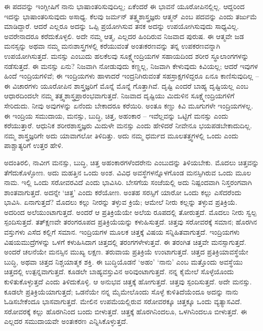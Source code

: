 ಈ ಪದವನ್ನು ಇಂಗ್ಲೀಷಿಗೆ ನಾನು ಭಾಷಾಂತರಿಸುವುದಿಲ್ಲ; ಏಕೆಂದರೆ ಈ ಭಾವನೆ ಯೂರೋಪಿನಲ್ಲಿಲ್ಲ. ಆದ್ದರಿಂದ ಇದನ್ನು ಭಾಷಾಂತರಿಸುವುದು ಅಸಾಧ್ಯ. ಕೆಲವು ಜರ್ಮನ್​ ತತ್ತ್ವಶಾಸ್ತ್ರಜ್ಞರು ಆತ್ಮನ್​ ಎಂಬ ಪದವನ್ನು  ಎಂದು ತರ್ಜುಮೆ ಮಾಡಿದ್ದಾರೆ. ಆದರೆ ಎಲ್ಲರೂ ಅದನ್ನು ಒಪ್ಪಿ ಪ್ರಯೋಗಿಸುವ ತನಕ ಅದನ್ನು ಉಪಯೋಗಿಸುವುದು ಸಾಧ್ಯವಿಲ್ಲ. ಅವರೇನಾದರೂ ಕರೆದುಕೊಳ್ಳಲಿ. ಅದೇ ನಮ್ಮ ಆತ್ಮ, ಎಲ್ಲದರ ಹಿಂದಿರುವ ನಿಜವಾದ ಪುರುಷ. ಈ ಆತ್ಮವೇ ಜಡ ಮನಸ್ಸನ್ನು ಅಥವಾ ನಮ್ಮ ಮನಃಶಾಸ್ತ್ರಗಳಲ್ಲಿ ಕರೆಯುವಂತೆ ಅಂತಃಕರಣವನ್ನು ತನ್ನ ಉಪಕರಣವನ್ನಾಗಿ ಉಪಯೋಗಿಸುತ್ತದೆ. ಮನಸ್ಸು ಎಂಬುದು ಹಲಕೆಲವು ಸೂಕ್ಷ್ಮೇಂದ್ರಿಯಗಳ ಸಹಾಯದಿಂದ ಶರೀರ ಸ್ಥೂಲಾಂಗಗಳನ್ನು ನಡೆಸುತ್ತದೆ. ಈ ಮನಸ್ಸು ಏನು? ನಿಜವಾಗಿ ನೋಡುವುದು ಕಣ್ಣಲ್ಲ, ನಿಜವಾಗಿ ಕೇಳುವುದು ಕಿವಿಯಲ್ಲ; ಆದರೆ ಇವುಗಳ ಹಿಂದೆ ಇಂದ್ರಿಯಗಳಿವೆ; ಈ ಇಂದ್ರಿಯಗಳು ಹಾಳಾದರೆ ಇಂದ್ರನಿಗಿರುವಂತೆ ಸಹಸ್ರಾಕ್ಷಗಳಿದ್ದರೂ ಏನೂ ಕಾಣಿಸುವುದಿಲ್ಲ – ಈ ವಿಚಾರಗಳು ಯೂರೋಪಿನ ಶಾಸ್ತ್ರಜ್ಞರಿಗೆ ಮೊನ್ನೆ ಮೊನ್ನೆ ಗೊತ್ತಾಗಿವೆ. ದೃಷ್ಟಿ ಎಂದರೆ ಬಾಹ್ಯ ದೃಷ್ಟಿಯಲ್ಲ ಎಂಬ ಆಧಾರದಿಂದಲೇ ನಮ್ಮ ತತ್ತ್ವಶಾಸ್ತ್ರಪ್ರಾರಂಭವಾಗುತ್ತದೆ. ನಿಜವಾದ ದೃಷ್ಟಿಯು ಮಿದುಳಿನ ಸೂಕ್ಷ್ಮೇಂದ್ರಿಯಗಳಿಗೆ ಸೇರಿದುದು. ನೀವು ಅವುಗಳನ್ನು ಏನೆಂದು ಬೇಕಾದರೂ ಕರೆಯಿರಿ. ಅಂತೂ ಕಣ್ಣು ಕಿವಿ ಮೂಗುಗಳೇ ಇಂದ್ರಿಯಗಳಲ್ಲ. ಈ ಇಂದ್ರಿಯ ಸಮುದಾಯ, ಮನಸ್ಸು, ಬುದ್ಧಿ, ಚಿತ್ತ, ಅಹಂಕಾರ – ಇವೆಲ್ಲವನ್ನು ಒಟ್ಟಿಗೆ ಮನಸ್ಸು  ಎಂದು ಕರೆಯುತ್ತಾರೆ. ಆಧುನಿಕ ಶರೀರಶಾಸ್ತ್ರಜ್ಞರು ಮಿದುಳೇ ಮನಸ್ಸು ಎಂದು ಹೇಳಿದರೆ ನೀವೇನೂ ಭಯಪಡಬೇಕಾದುದಿಲ್ಲ. ನಮ್ಮ ಶಾಸ್ತ್ರಜ್ಞರಿಗೇ ಅದು ಯಾವಾಗಲೋ ತಿಳಿದಿತ್ತು. ಅದು ನಮ್ಮ ಧರ್ಮದ ಮೂಲತತ್ತ್ವಗಳಲ್ಲಿ ಒಂದು ಎಂದು ಪಾಶ್ಚಾತ್ಯರಿಗೆ ಉತ್ತರ ಹೇಳಿ. 

ಅದಂತಿರಲಿ, ನಾವೀಗ ಮನಸ್ಸು, ಬುದ್ಧಿ, ಚಿತ್ತ ಅಹಂಕಾರಗಳೆಂದರೇನು ಎಂಬುದನ್ನು ತಿಳಿಯಬೇಕು. ಮೊದಲು ಚಿತ್ತವನ್ನು ತೆಗೆದುಕೊಳ್ಳೋಣ. ಅದು ಮಹತ್ತಿನ ಒಂದು ಅಂಶ. ವಿವಿಧ ಅವಸ್ಥೆಗಳನ್ನೊಳಗೊಂಡ ಮನಸ್ಸಿಗಿರುವ ಒಂದು ಮೂಲ ನಾಮ. ಇಲ್ಲಿ ಒಂದು ಸರೋವರವಿದೆ ಎಂದು ಭಾವಿಸಿರಿ. ಬೇಸಗೆಯ ಸಂಜೆಯಲ್ಲಿ ಅದು ನಿಷ್ಪಂದವಾಗಿ ನಿಸ್ತರಂಗವಾಗಿ ಶಾಂತವಾಗುತ್ತದೆ. ಅದನ್ನೇ ‘ಚಿತ್ತ’ ಎಂದು ಕರೆಯೋಣ. ಅಂತಹ ಸರಸ್ಸಿಗೆ ಯಾರೋ ಒಂದು ಕಲ್ಲು ಎಸೆದರೆಂದು ಭಾವಿಸಿ. ಏನಾಗುತ್ತದೆ? ಮೊದಲು ಕಲ್ಲು ನೀರನ್ನು ತಳ್ಳುವ ಕ್ರಿಯೆ; ಆಮೇಲೆ ನೀರು ಕಲ್ಲನ್ನು ತಳ್ಳುವ ಪ್ರತಿಕ್ರಿಯೆ. ಅದರಿಂದ ಅಲೆಯುಂಟಾಗುತ್ತದೆ. ಅಂದರೆ ಆ ಪ್ರತಿಕ್ರಿಯೆಯೇ ಅಲೆಯ ರೂಪದಲ್ಲಿ ತೋರುತ್ತದೆ. ಮೊದಲು ನೀರು ಸ್ವಲ್ಪ ಸ್ಪಂದಿಸುತ್ತದೆ. ತತ್​ಕ್ಷಣವೇ ತರಂಗರೂಪದ ಪ್ರತಿಕ್ರಿಯೆಯನ್ನು ಕಳುಹಿಸುತ್ತದೆ. ಚಿತ್ತವು ಸರೋವರಕ್ಕೆ ಸಮಾನ; ಹೊರಗಿನ ವಸ್ತುಗಳು ಎಸೆದ ಕಲ್ಲಿಗೆ ಸಮಾನ. ಇಂದ್ರಿಯಗಳ ಮೂಲಕ ಚಿತ್ತಕ್ಕೆ ವಿಷಯ ಸನ್ನಿಹಿತವಾಗುತ್ತದೆ. ಇಂದ್ರಿಯಗಳು ವಿಷಯಮುದ್ರೆಗಳನ್ನು ಒಳಗೆ ಕಳುಹಿಸಿದಾಗ ಚಿತ್ತದಲ್ಲಿ ತರಂಗಗಳೇಳುತ್ತವೆ. ಈ ತರಂಗಿತ ಚಿತ್ತವೇ ಮನಸ್ಸಾಗುತ್ತದೆ. ಅಂದರೆ ಚಲನೆಯೇ ಮನಸ್ಸಿನ ಮುಖ್ಯ ಲಕ್ಷಣ. ತರುವಾಯ ಪ್ರತಿಕ್ರಿಯೆ ಉಂಟಾಗುತ್ತದೆ. ಚಿತ್ತದ ಪ್ರತಿಕ್ರಿಯಾವಸ್ಥೆಯೇ ಬುದ್ಧಿ, ಅಥವಾ ಚಿತ್ತದ ನಿಶ್ಚಯಾತ್ಮಕ ಶಕ್ತಿ. ಈ ಬುದ್ಧಿಯೊಡನೆ ‘ಅಹಂ’ ‘ನಾನು’ ಎಂಬ ಮತ್ತೊಂದು ಅವಸ್ಥೆಯು ಚಿತ್ತದಲ್ಲಿ ಉತ್ಪನ್ನವಾಗುತ್ತದೆ. ಕೂಡಲೇ ಬಾಹ್ಯವಸ್ತುವಿನ ಅರಿವುಂಟಾಗುತ್ತದೆ. ನನ್ನ ಕೈಮೇಲೆ ಸೊಳ್ಳೆಯೊಂದು ಕುಳಿತುಕೊಳ್ಳುತ್ತದೆ ಎಂದು ತಿಳಿದುಕೊಳ್ಳಿ. ಆ ಅನುಭವ ಚಿತ್ತಕ್ಕೆ ಹೋಗುತ್ತದೆ. ಚಿತ್ತವು ಸ್ಪಂದಿಸುತ್ತದೆ. ಅದೇ ಮನಸ್ಸು. ಕೂಡಲೇ ಪ್ರತಿಕ್ರಿಯೆಯಾಗುತ್ತದೆ; ಒಡನೆಯೇ ನನ್ನ ಮೈಮೇಲೊಂದು ಸೊಳ್ಳೆ ಕುಳಿತಿದೆಯೆಂದೂ ಅದನ್ನು ನಾನು ಓಡಿಸಬೇಕೆಂದೂ ಭಾಸವಾಗುತ್ತದೆ. ಮೇಲಿನ ಉಪಮೆಯಲ್ಲಿರುವ ಸರೋವರಕ್ಕೂ ಚಿತ್ತಕ್ಕೂ ಒಂದು ವ್ಯತ್ಯಾಸವಿದೆ. ಸರೋವರಕ್ಕೆ ಕಲ್ಲು ಹೊರಗಿನಿಂದ ಬಂದು ಬೀಳುತ್ತದೆ. ಚಿತ್ತಕ್ಕೆ ಹೊರಗಿನಿಂದಲೂ, ಒಳಗಿನಿಂದಲೂ ಬೀಳುತ್ತದೆ. ಈ ಎಲ್ಲದರ ಸಮುದಾಯವೇ ಅಂತಃಕರಣ ಎನ್ನಿಸಿಕೊಳ್ಳುತ್ತದೆ. 

